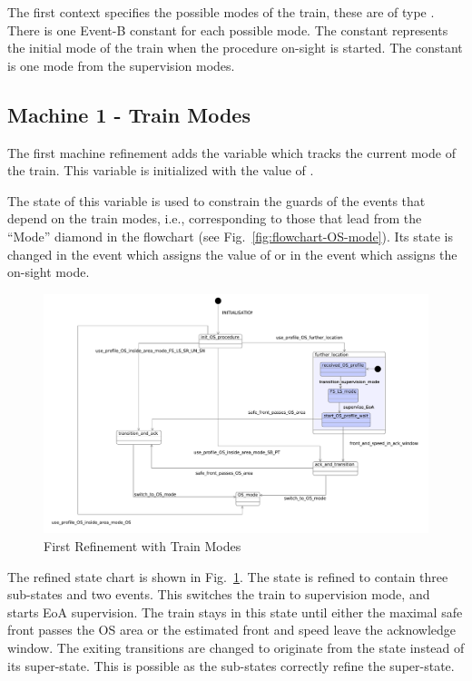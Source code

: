 \documentclass{template/openetcs_article}
\begin{document}
The first context  specifies the possible modes of the train, these are
of type . There is one Event-B constant for each possible
mode. The constant  represents the initial mode of the
train when the procedure on-sight is started. The constant
 is one mode from the supervision modes.

{\footnotesize

}

\subsection{Machine 1 - Train Modes}
\label{sec:machine-1-train}

The first machine refinement adds the variable  which tracks
the current mode of the train. This variable is initialized with the value of
.

The state of this variable is used to constrain the guards of the events that
depend on the train modes, i.e., corresponding to those that lead from the
``Mode'' diamond in the flowchart (see Fig.~\ref{fig:flowchart-OS-mode}).
Its state is changed in the  event
which assigns the value of  or in the
 event which assigns the on-sight mode.

\begin{figure}[ht]
  \centering
  \includegraphics[width=.95\textwidth]{m1_train_modes_on_sight_procedure}
  \caption{First Refinement with Train Modes}
  \label{fig:first-refinement}
\end{figure}

The refined state chart is shown in Fig.~\ref{fig:first-refinement}. The state
 is refined to contain three sub-states and two
events. This switches the train to supervision mode, and starts EoA
supervision. The train stays in this state until either the maximal safe front
passes the OS area or the estimated front and speed leave the acknowledge
window. The exiting transitions are changed to originate from the
 state instead of its super-state. This is
possible as the sub-states correctly refine the super-state.
\end{document}
